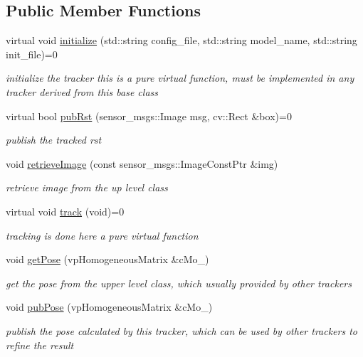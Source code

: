 \subsection*{\-Public \-Member \-Functions}
\begin{DoxyCompactItemize}
\item 
\hypertarget{classbaseTracker_a540e094b670af7eb5080d32ed04f688c}{virtual void \hyperlink{classbaseTracker_a540e094b670af7eb5080d32ed04f688c}{initialize} (std\-::string config\-\_\-file, std\-::string model\-\_\-name, std\-::string init\-\_\-file)=0}\label{classbaseTracker_a540e094b670af7eb5080d32ed04f688c}

\begin{DoxyCompactList}\small\item\em initialize the tracker this is a pure virtual function, must be implemented in any tracker derived from this base class \end{DoxyCompactList}\item 
virtual bool \hyperlink{classbaseTracker_a89709d06921be0e67c88babec80b51e3}{pub\-Rst} (sensor\-\_\-msgs\-::\-Image msg, cv\-::\-Rect \&box)=0
\begin{DoxyCompactList}\small\item\em publish the tracked rst \end{DoxyCompactList}\item 
void \hyperlink{classbaseTracker_a2198d9d00a0e07c1e47ffb44d0cf77f9}{retrieve\-Image} (const sensor\-\_\-msgs\-::\-Image\-Const\-Ptr \&img)
\begin{DoxyCompactList}\small\item\em retrieve image from the up level class \end{DoxyCompactList}\item 
\hypertarget{classbaseTracker_ac46db4ee279f65cf9eb8d1e679f064f2}{virtual void \hyperlink{classbaseTracker_ac46db4ee279f65cf9eb8d1e679f064f2}{track} (void)=0}\label{classbaseTracker_ac46db4ee279f65cf9eb8d1e679f064f2}

\begin{DoxyCompactList}\small\item\em tracking is done here a pure virtual function \end{DoxyCompactList}\item 
void \hyperlink{classbaseTracker_a07d8b238b21d4d5aa12d38302fd5d863}{get\-Pose} (vp\-Homogeneous\-Matrix \&c\-Mo\-\_\-)
\begin{DoxyCompactList}\small\item\em get the pose from the upper level class, which usually provided by other trackers \end{DoxyCompactList}\item 
void \hyperlink{classbaseTracker_a30e0216b0211dd9874dbf6daf34b4408}{pub\-Pose} (vp\-Homogeneous\-Matrix \&c\-Mo\-\_\-)
\begin{DoxyCompactList}\small\item\em publish the pose calculated by this tracker, which can be used by other trackers to refine the result \end{DoxyCompactList}\end{DoxyCompactItemize}
